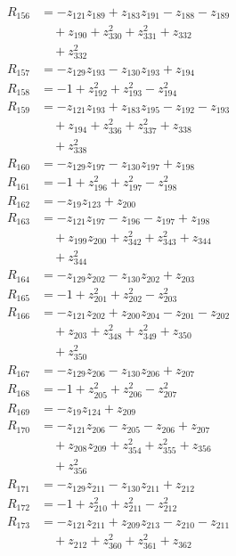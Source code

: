 \begin{align*}
R_{156} &= -z_{121}z_{189} +z_{183}z_{191} -z_{188} -z_{189} \\
&\quad +z_{190} +z_{330}^{2} +z_{331}^{2} +z_{332} \\
&\quad +z_{332}^{2} \\
R_{157} &= -z_{129}z_{193} -z_{130}z_{193} +z_{194} \\
R_{158} &= -1 +z_{192}^{2} +z_{193}^{2} -z_{194}^{2} \\
R_{159} &= -z_{121}z_{193} +z_{183}z_{195} -z_{192} -z_{193} \\
&\quad +z_{194} +z_{336}^{2} +z_{337}^{2} +z_{338} \\
&\quad +z_{338}^{2} \\
R_{160} &= -z_{129}z_{197} -z_{130}z_{197} +z_{198} \\
R_{161} &= -1 +z_{196}^{2} +z_{197}^{2} -z_{198}^{2} \\
R_{162} &= -z_{19}z_{123} +z_{200} \\
R_{163} &= -z_{121}z_{197} -z_{196} -z_{197} +z_{198} \\
&\quad +z_{199}z_{200} +z_{342}^{2} +z_{343}^{2} +z_{344} \\
&\quad +z_{344}^{2} \\
R_{164} &= -z_{129}z_{202} -z_{130}z_{202} +z_{203} \\
R_{165} &= -1 +z_{201}^{2} +z_{202}^{2} -z_{203}^{2} \\
R_{166} &= -z_{121}z_{202} +z_{200}z_{204} -z_{201} -z_{202} \\
&\quad +z_{203} +z_{348}^{2} +z_{349}^{2} +z_{350} \\
&\quad +z_{350}^{2} \\
R_{167} &= -z_{129}z_{206} -z_{130}z_{206} +z_{207} \\
R_{168} &= -1 +z_{205}^{2} +z_{206}^{2} -z_{207}^{2} \\
R_{169} &= -z_{19}z_{124} +z_{209} \\
R_{170} &= -z_{121}z_{206} -z_{205} -z_{206} +z_{207} \\
&\quad +z_{208}z_{209} +z_{354}^{2} +z_{355}^{2} +z_{356} \\
&\quad +z_{356}^{2} \\
R_{171} &= -z_{129}z_{211} -z_{130}z_{211} +z_{212} \\
R_{172} &= -1 +z_{210}^{2} +z_{211}^{2} -z_{212}^{2} \\
R_{173} &= -z_{121}z_{211} +z_{209}z_{213} -z_{210} -z_{211} \\
&\quad +z_{212} +z_{360}^{2} +z_{361}^{2} +z_{362} \\

\end{align*}
